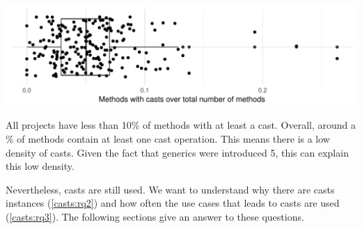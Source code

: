 \includegraphics[width=0.9\columnwidth]{analysis/stats-methodwcastXproject.pdf}

All projects have less than 10\% of methods with at least a cast.
Overall, around a \castpercentage{}\% of methods contain at least one cast operation. 
This means there is a low density of casts.
Given the fact that generics were introduced \java{} 5, this can explain this low density.

Nevertheless, casts are still used.
We want to understand why there are casts instances (\ref{casts:rq2}) and how often the use cases that leads to casts are used (\ref{casts:rq3}).
The following sections give an answer to these questions.

